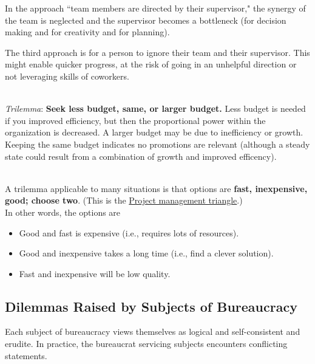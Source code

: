 In the approach ``team members are directed by their supervisor," the synergy of the team is neglected and the supervisor becomes a bottleneck (for decision making and for creativity and for planning).

The third approach is for a person to ignore their team and their supervisor. This might enable quicker progress, at the risk of going in an unhelpful direction or not leveraging skills of coworkers. 

\ \\

\textit{Trilemma}:
\textbf{Seek less budget, same, or larger budget.} 
Less budget is needed if you improved efficiency, but then the proportional power within the organization is decreased. A larger budget may be due to inefficiency or growth. Keeping the same budget indicates no promotions are relevant (although a steady state could result from a combination of growth and improved efficency). 

\ \\

A trilemma applicable to many situations is that options are \textbf{fast, inexpensive, good; choose two}. 
(This is the \href{https://en.wikipedia.org/wiki/Project_management_triangle}{Project management triangle}.) \\
In other words, the options are
\begin{itemize}
    \item Good and fast is expensive (i.e., requires lots of resources).
    \item Good and inexpensive takes a long time (i.e., find a clever solution).
    \item Fast and inexpensive will be low quality.
\end{itemize}

\subsection*{Dilemmas Raised by Subjects of Bureaucracy\label{sec:subjects-dilemmas}}

Each subject of bureaucracy views themselves as logical and self-consistent and erudite. In practice, the bureaucrat servicing subjects encounters conflicting statements. 

